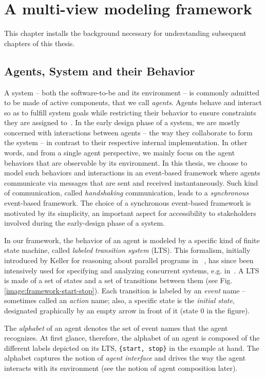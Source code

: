\chapter{A multi-view modeling framework\label{chapter:framework}}

This chapter installs the background necessary for understanding subsequent chapters of this thesis. 

\section{Agents, System and their Behavior}

A system -- both the software-to-be and its environment -- is commonly admitted to be made of active components, that we call \emph{agents}. Agents behave and interact so as to fulfill system goals while restricting their behavior to ensure constraints they are assigned to~\cite{Feather:1987}. In the early design phase of a system, we are mostly concerned with interactions between agents -- the way they collaborate to form the system -- in contrast to their respective internal implementation. In other words, and from a single agent perspective, we mainly focus on the agent behaviors that are observable by its environment. In this thesis, we choose to model such behaviors and interactions in an event-based framework where agents communicate via messages that are sent and received instantaneously. Such kind of communication, called \emph{handshaking} communication, leads to a \emph{synchronous} event-based framework. The choice of a synchronous event-based framework is motivated by its simplicity, an important aspect for accessibility to stakeholders involved during the early-design phase of a system.

In our framework, the behavior of an agent is modeled by a specific kind of finite state machine, called \emph{labeled transition system} (LTS). This formalism, initially introduced by Keller for reasoning about parallel programs in ~\cite{Keller:1976}, has since been intensively used for specifying and analyzing concurrent systems, e.g. in~\cite{Milner:1989, Clarke:1989, Magee:1997}. A LTS is made of a set of states and a set of transitions between them (see Fig.\ref{image:framework-start-stop}). Each transition is labeled by an \emph{event} name -- sometimes called an \emph{action} name; also, a specific state is the \emph{initial state}, designated graphically by an empty arrow in front of it (state 0 in the figure).

The \emph{alphabet} of an agent denotes the set of event names that the agent recognizes. At first glance, therefore, the alphabet of an agent is composed of the different labels depicted on its LTS, \verb|{start, stop}| in the example at hand. The alphabet captures the notion of \emph{agent interface} and drives the way the agent interacts with its environment (see the notion of agent composition later).


